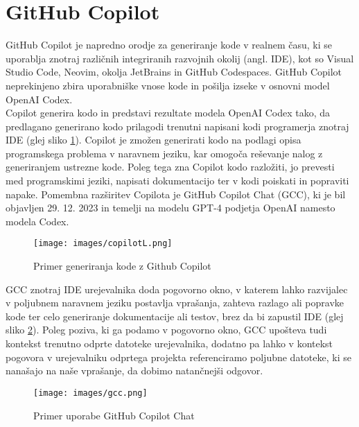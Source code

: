 \documentclass[a4paper,12pt,openright]{book}
\begin{document}
\section{GitHub Copilot}

GitHub Copilot je napredno orodje za generiranje kode v realnem času, ki se uporablja znotraj različnih integriranih razvojnih okolij (angl. IDE), kot so Visual Studio Code, Neovim, okolja JetBrains in GitHub Codespaces. GitHub Copilot neprekinjeno zbira uporabniške vnose kode in pošilja izseke v osnovni model OpenAI Codex. \\
Copilot generira kodo in predstavi rezultate modela OpenAI Codex tako, da predlagano generirano kodo prilagodi trenutni napisani kodi programerja znotraj IDE (glej sliko \ref{fig:copilot}). Copilot je zmožen generirati kodo na podlagi opisa programskega problema v naravnem jeziku, kar omogoča reševanje nalog z generiranjem ustrezne kode. Poleg tega zna Copilot kodo razložiti, jo prevesti med programskimi jeziki, napisati dokumentacijo ter v kodi poiskati in popraviti napake.
Pomembna razširitev Copilota je GitHub Copilot Chat (GCC), ki je bil objavljen 29. 12. 2023 in temelji na modelu GPT-4 podjetja OpenAI namesto modela Codex. 
\cite{Sundqvist1866649} \\
\begin{figure}[H]
    \centering
    \texttt{[image: images/copilotL.png]}
    \caption{Primer generiranja kode z Github Copilot}
    \label{fig:copilot}
\end{figure}

GCC znotraj IDE urejevalnika doda pogovorno okno, v katerem lahko razvijalec v poljubnem naravnem jeziku postavlja vprašanja, zahteva razlago ali popravke kode ter celo generiranje dokumentacije ali testov, brez da bi zapustil IDE (glej sliko \ref{fig:gcc}). Poleg poziva, ki ga podamo v pogovorno okno, GCC upošteva tudi kontekst trenutno odprte datoteke urejevalnika, dodatno pa lahko v kontekst pogovora v urejevalniku odprtega projekta referenciramo poljubne datoteke, ki se nanašajo na naše vprašanje, da dobimo natančnejši odgovor.\cite{github_copilot_chat} \\
\begin{figure}[H]
    \centering
    \texttt{[image: images/gcc.png]}
    \caption{Primer uporabe GitHub Copilot Chat}
    \label{fig:gcc}
\end{figure}
\end{document}
